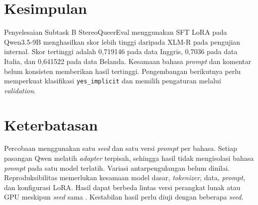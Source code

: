 \documentclass[11pt]{article}
\begin{document}
\section{Kesimpulan}
Penyelesaian Subtask B StereoQueerEval menggunakan SFT LoRA pada Qwen3.5-9B menghasilkan skor lebih tinggi daripada XLM-R pada pengujian internal. Skor tertinggi adalah 0,719146 pada data Inggris, 0,7036 pada data Italia, dan 0,641522 pada data Belanda. Kesamaan bahasa \textit{prompt} dan komentar belum konsisten memberikan hasil tertinggi. Pengembangan berikutnya perlu memperkuat klasifikasi \texttt{yes\_implicit} dan memilih pengaturan melalui \textit{validation}.

\section*{Keterbatasan}
Percobaan menggunakan satu \textit{seed} dan satu versi \textit{prompt} per bahasa. Setiap pasangan Qwen melatih \textit{adapter} terpisah, sehingga hasil tidak mengisolasi bahasa \textit{prompt} pada satu model terlatih. Variasi antarpengulangan belum dinilai. Reproduksibilitas memerlukan kesamaan model dasar, \textit{tokenizer}, data, \textit{prompt}, dan konfigurasi LoRA. Hasil dapat berbeda lintas versi perangkat lunak atau GPU meskipun \textit{seed} sama \citep{pytorch-reproducibility}. Kestabilan hasil perlu diuji dengan beberapa \textit{seed}.

\clearpage

\end{document}
